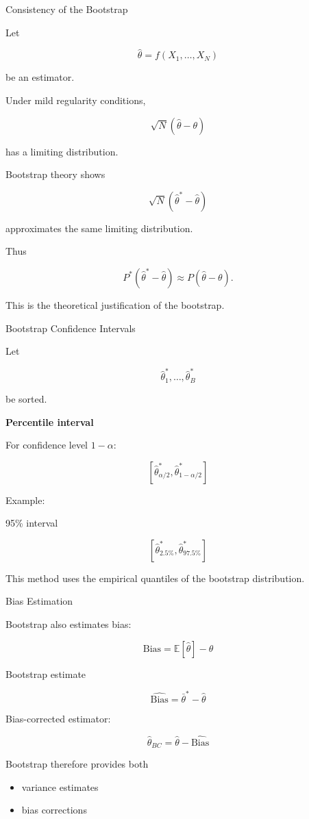 \documentclass{beamer}
\begin{document}

\begin{frame}{Consistency of the Bootstrap}

Let

\[
\hat{\theta}=f(X_1,\dots,X_N)
\]

be an estimator.

Under mild regularity conditions,

\[
\sqrt{N}(\hat{\theta}-\theta)
\]

has a limiting distribution.

Bootstrap theory shows

\[
\sqrt{N}(\hat{\theta}^*-\hat{\theta})
\]

approximates the same limiting distribution.

Thus

\[
P^*(\hat{\theta}^*-\hat{\theta})
\approx
P(\hat{\theta}-\theta).
\]

This is the theoretical justification of the bootstrap.
\end{frame}


\begin{frame}{Bootstrap Confidence Intervals}

Let

\[
\hat{\theta}_1^*,\dots,\hat{\theta}_B^*
\]

be sorted.

\textbf{Percentile interval}

For confidence level $1-\alpha$:

\[
[\hat{\theta}_{\alpha/2}^*, \hat{\theta}_{1-\alpha/2}^*]
\]

Example:

95\% interval

\[
[\hat{\theta}_{2.5\%}^*,\hat{\theta}_{97.5\%}^*]
\]

This method uses the empirical quantiles of the bootstrap distribution.
\end{frame}


\begin{frame}{Bias Estimation}

Bootstrap also estimates bias:

\[
\text{Bias} =
\mathbb{E}[\hat{\theta}] - \theta
\]

Bootstrap estimate

\[
\widehat{\text{Bias}}
=
\bar{\theta}^* - \hat{\theta}
\]

Bias-corrected estimator:

\[
\hat{\theta}_{BC}
=
\hat{\theta} - \widehat{\text{Bias}}
\]

Bootstrap therefore provides both

\begin{itemize}
\item variance estimates
\item bias corrections
\end{itemize}
\end{frame}
\end{document}
